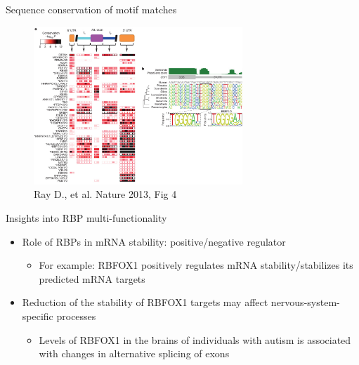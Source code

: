 \documentclass[professionalfont, 12pt, default]{beamer}
\providecommand{\tightlist}{%
    \setlength{\itemsep}{0pt}\setlength{\parskip}{0pt}}
\begin{document}
\begin{frame}{Sequence conservation of motif matches}

\begin{figure}
\centering
\includegraphics[width=0.70000\textwidth]{img/f4.jpg}
\caption{Ray D., et al. Nature 2013, Fig 4}
\end{figure}

\end{frame}

\begin{frame}{Insights into RBP multi-functionality}

\begin{itemize}
\tightlist
\item
  Role of RBPs in mRNA stability: positive/negative regulator

  \begin{itemize}
  \tightlist
  \item
    For example: RBFOX1 positively regulates mRNA stability/stabilizes
    its predicted mRNA targets
  \end{itemize}
\item
  Reduction of the stability of RBFOX1 targets may affect
  nervous-system-specific processes

  \begin{itemize}
  \tightlist
  \item
    Levels of RBFOX1 in the brains of individuals with autism is
    associated with changes in alternative splicing of exons
  \end{itemize}
\end{itemize}

\end{frame}
\end{document}
